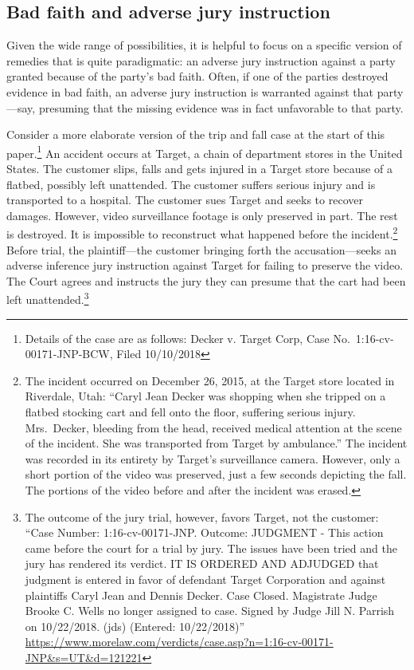 \documentclass[
  10pt,
  dvipsnames,enabledeprecatedfontcommands]{scrartcl}
\begin{document}
\hypertarget{bad-faith-and-adverse-jury-instruction}{%
\subsection{Bad faith and adverse jury
instruction}\label{bad-faith-and-adverse-jury-instruction}}

Given the wide range of possibilities, it is helpful to focus on a
specific version of remedies that is quite paradigmatic: an adverse jury
instruction against a party granted because of the party's bad faith.
Often, if one of the parties destroyed evidence in bad faith, an adverse
jury instruction is warranted against that party---say, presuming that
the missing evidence was in fact unfavorable to that party.

Consider a more elaborate version of the trip and fall case at the start
of this paper.\footnote{Details of the case are as follows: Decker v.
  Target Corp, Case No.~1:16-cv-00171-JNP-BCW, Filed 10/10/2018} An
accident occurs at Target, a chain of department stores in the United
States. The customer slips, falls and gets injured in a Target store
because of a flatbed, possibly left unattended. The customer suffers
serious injury and is transported to a hospital. The customer sues
Target and seeks to recover damages. However, video surveillance footage
is only preserved in part. The rest is destroyed. It is impossible to
reconstruct what happened before the incident.\footnote{The incident
  occurred on December 26, 2015, at the Target store located in
  Riverdale, Utah: ``Caryl Jean Decker was shopping when she tripped on
  a flatbed stocking cart and fell onto the floor, suffering serious
  injury. Mrs.~Decker, bleeding from the head, received medical
  attention at the scene of the incident. She was transported from
  Target by ambulance.'' The incident was recorded in its entirety by
  Target's surveillance camera. However, only a short portion of the
  video was preserved, just a few seconds depicting the fall. The
  portions of the video before and after the incident was erased.}
Before trial, the plaintiff---the customer bringing forth the
accusation---seeks an adverse inference jury instruction against Target
for failing to preserve the video. The Court agrees and instructs the
jury they can presume that the cart had been left unattended.\footnote{The
  outcome of the jury trial, however, favors Target, not the customer:
  ``Case Number: 1:16-cv-00171-JNP. Outcome: JUDGMENT - This action came
  before the court for a trial by jury. The issues have been tried and
  the jury has rendered its verdict. IT IS ORDERED AND ADJUDGED that
  judgment is entered in favor of defendant Target Corporation and
  against plaintiffs Caryl Jean and Dennis Decker. Case Closed.
  Magistrate Judge Brooke C. Wells no longer assigned to case. Signed by
  Judge Jill N. Parrish on 10/22/2018. (jds) (Entered: 10/22/2018)''
  \url{https://www.morelaw.com/verdicts/case.asp?n=1:16-cv-00171-JNP\&s=UT\&d=121221}}
\end{document}
